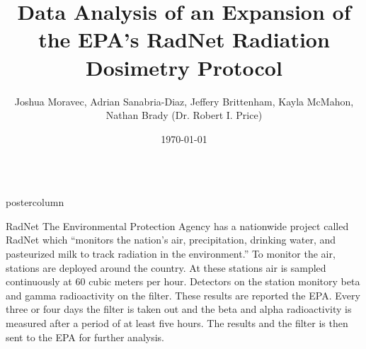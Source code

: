 \documentclass[final,11pt]{beamer}
\title{Data Analysis of an Expansion of the EPA’s RadNet Radiation Dosimetry Protocol}
\author{Joshua Moravec, Adrian Sanabria-Diaz, Jeffery Brittenham, Kayla McMahon, Nathan Brady (Dr. Robert I. Price)}
\institute[University of Nebraska at Kearney]{Physics Department, University of Nebraska at Kearney, Kearney, Nebraska}
\date[\today]{\today}
\newlength{\columnheight}
\begin{document}
\begin{frame}
	\begin{columns}
		\begin{column}{.30\textwidth}
			\begin{beamercolorbox}[center,wd=\textwidth]{postercolumn}
				\begin{minipage}[T]{.95\textwidth}
					\parbox[t][\columnheight]{\textwidth}{
						\begin{block}{RadNet}
					\small	The Environmental Protection Agency has a nationwide project called RadNet which ``monitors the nation's air, precipitation, drinking water, and pasteurized milk to track radiation in the environment.'' To monitor the air, stations are deployed around the country. At these stations air is sampled continuously at 60 cubic meters per hour. Detectors on the station monitory beta and gamma radioactivity on the filter. These results are reported the EPA. Every three or four days the filter is taken out and the beta and alpha radioactivity is measured after a period of at least five hours. The results and the filter is then sent to the EPA for further analysis.
						\end{block}
						\vfill
					}
				\end{minipage}
			\end{beamercolorbox}
		\end{column}


\end{columns}
\end{frame}
\end{document}
